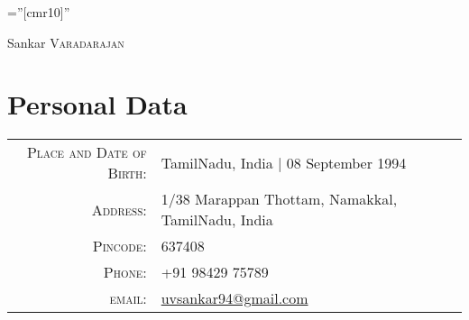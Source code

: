 \documentclass[a4paper,10pt]{article}
\begin{document}

\pagestyle{empty} %

\font\fb=''[cmr10]'' %

\par{\centering
		{\Huge Sankar \textsc{Varadarajan}
	}\bigskip\par}

\section{Personal Data}

\begin{tabular}{rl}
    \textsc{Place and Date of Birth:} & TamilNadu, India  | 08 September 1994 \\
    \textsc{Address:}   & 1/38 Marappan Thottam, Namakkal, TamilNadu, India \\
    \textsc{Pincode:}   & 637408\\
    \textsc{Phone:}     & +91 98429 75789\\
    \textsc{email:}     &  \href{mailto:uvsankar94@gmail.com}{uvsankar94@gmail.com}
\end{tabular}

\end{document}
